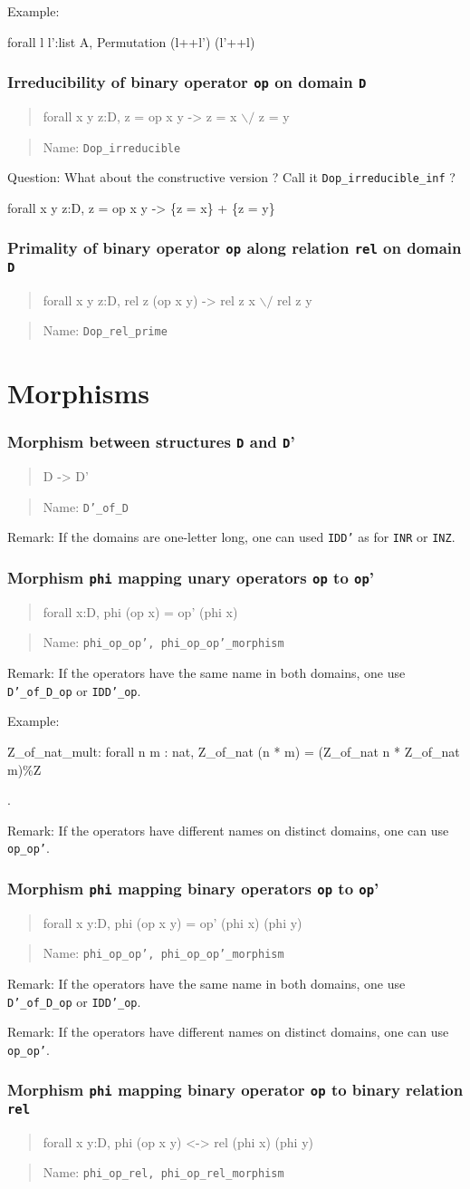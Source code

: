 \documentclass[a4paper]{article}
\newcommand\itemrule[3]{
\subsubsection{#1}
\begin{quote}
\begin{tt}
#3
\end{tt}
\end{quote}
\begin{quote}
Name: \texttt{#2}
\end{quote}}
\newcommand\formula[1]{\begin{tt}#1\end{tt}}
\newcommand\name[1]{\texttt{#1}}
\newcommand\op{\texttt{op}}
\newcommand\phimapping{\texttt{phi}}
\newcommand\D{\texttt{D}}
\newcommand\rel{\texttt{rel}}
\begin{document}
  Example:
\formula{forall l l':list A, Permutation (l++l') (l'++l)}

\itemrule{Irreducibility of binary operator {\op} on domain {\D}}{Dop\_irreducible}
{forall x y z:D, z = op x y -> z = x $\backslash/$ z = y}

  Question: What about the constructive version ? Call it \name{Dop\_irreducible\_inf} ?
\formula{forall x y z:D, z = op x y -> \{z = x\} + \{z = y\}}

\itemrule{Primality of binary operator {\op} along relation {\rel} on domain {\D}}{Dop\_rel\_prime}
{forall x y z:D, rel z (op x y) -> rel z x $\backslash/$ rel  z y}


\section{Morphisms}

\itemrule{Morphism between structures {\D} and {\D'}}{\name{D'\_of\_D}}{D -> D'}

Remark: If the domains are one-letter long, one can used \texttt{IDD'} as for
\name{INR} or \name{INZ}.

\itemrule{Morphism {\phimapping} mapping unary operators {\op} to {\op'}}{phi\_op\_op', phi\_op\_op'\_morphism}
{forall x:D, phi (op x) = op' (phi x)}

Remark: If the operators have the same name in both domains, one use
\texttt{D'\_of\_D\_op} or \texttt{IDD'\_op}.

Example: \formula{Z\_of\_nat\_mult: forall n m : nat, Z\_of\_nat (n * m) = (Z\_of\_nat n * Z\_of\_nat m)\%Z}.

Remark: If the operators have different names on distinct domains, one
can use \texttt{op\_op'}.

\itemrule{Morphism {\phimapping} mapping binary operators {\op} to
{\op'}}{phi\_op\_op', phi\_op\_op'\_morphism}  {forall
x y:D, phi (op x y) = op' (phi x) (phi y)}

Remark: If the operators have the same name in both domains, one use
\texttt{D'\_of\_D\_op} or \texttt{IDD'\_op}.

Remark: If the operators have different names on distinct domains, one
can use \texttt{op\_op'}.

\itemrule{Morphism {\phimapping} mapping binary operator {\op} to
binary relation {\rel}}{phi\_op\_rel, phi\_op\_rel\_morphism}
{forall x y:D, phi (op x y) <-> rel (phi x) (phi y)}
\end{document}
